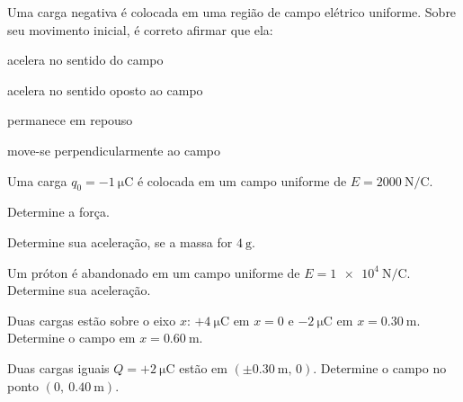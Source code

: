 \begin{questao}[1]{}

Uma carga negativa é colocada em uma região de campo elétrico uniforme. Sobre
seu movimento inicial, é correto afirmar que ela:
\begin{alternativas}[2]
\item acelera no sentido do campo
\item acelera no sentido oposto ao campo
\item permanece em repouso
\item move-se perpendicularmente ao campo
\end{alternativas}


\end{questao}

\blocoaplicacao
\begin{questao}[2]{}

Uma carga $q_0=-\SI{1}{\micro\coulomb}$ é colocada em um campo uniforme de
$E=\SI{2000}{\newton\per\coulomb}$.
\begin{itensq}
\item Determine a força.
\item Determine sua aceleração, se a massa for $\SI{4}{\gram}$.
\end{itensq}


\end{questao}
\begin{questao}[2]{}

Um próton é abandonado em um campo uniforme de
$E=\SI{1e4}{\newton\per\coulomb}$. Determine sua aceleração.


\end{questao}
\begin{questao}[2]{}

Duas cargas estão sobre o eixo $x$: $+\SI{4}{\micro\coulomb}$ em $x=0$ e
$-\SI{2}{\micro\coulomb}$ em $x=\SI{0.30}{\meter}$. Determine o campo em
$x=\SI{0.60}{\meter}$.


\end{questao}
\begin{questao}[2]{}

Duas cargas iguais $Q=+\SI{2}{\micro\coulomb}$ estão em
$(\pm\SI{0.30}{\meter},\,0)$. Determine o campo no ponto
$(0,\ \SI{0.40}{\meter})$.


\end{questao}
